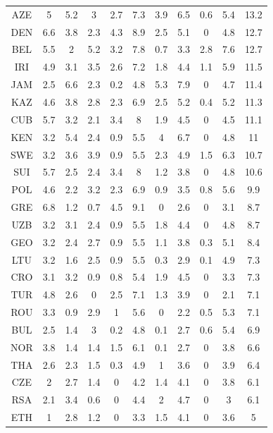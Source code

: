 \documentclass{mcmthesis}
\begin{document}
\begin{table}[htbp]
\begin{tabular}{|c|c|c|c|c|c|c|c|c|c|c|}
        AZE & 5 & 5.2 & 3 & 2.7 & 7.3 & 3.9 & 6.5 & 0.6 & 5.4 & 13.2 \\
        DEN & 6.6 & 3.8 & 2.3 & 4.3 & 8.9 & 2.5 & 5.1 & 0 & 4.8 & 12.7 \\
        BEL & 5.5 & 2 & 5.2 & 3.2 & 7.8 & 0.7 & 3.3 & 2.8 & 7.6 & 12.7 \\
        IRI & 4.9 & 3.1 & 3.5 & 2.6 & 7.2 & 1.8 & 4.4 & 1.1 & 5.9 & 11.5 \\
        JAM & 2.5 & 6.6 & 2.3 & 0.2 & 4.8 & 5.3 & 7.9 & 0 & 4.7 & 11.4 \\
        KAZ & 4.6 & 3.8 & 2.8 & 2.3 & 6.9 & 2.5 & 5.2 & 0.4 & 5.2 & 11.3 \\
        CUB & 5.7 & 3.2 & 2.1 & 3.4 & 8 & 1.9 & 4.5 & 0 & 4.5 & 11.1 \\
        KEN & 3.2 & 5.4 & 2.4 & 0.9 & 5.5 & 4 & 6.7 & 0 & 4.8 & 11 \\
        SWE & 3.2 & 3.6 & 3.9 & 0.9 & 5.5 & 2.3 & 4.9 & 1.5 & 6.3 & 10.7 \\
        SUI & 5.7 & 2.5 & 2.4 & 3.4 & 8 & 1.2 & 3.8 & 0 & 4.8 & 10.6 \\
        POL & 4.6 & 2.2 & 3.2 & 2.3 & 6.9 & 0.9 & 3.5 & 0.8 & 5.6 & 9.9 \\
        GRE & 6.8 & 1.2 & 0.7 & 4.5 & 9.1 & 0 & 2.6 & 0 & 3.1 & 8.7 \\
        UZB & 3.2 & 3.1 & 2.4 & 0.9 & 5.5 & 1.8 & 4.4 & 0 & 4.8 & 8.7 \\
        GEO & 3.2 & 2.4 & 2.7 & 0.9 & 5.5 & 1.1 & 3.8 & 0.3 & 5.1 & 8.4 \\
        LTU & 3.2 & 1.6 & 2.5 & 0.9 & 5.5 & 0.3 & 2.9 & 0.1 & 4.9 & 7.3 \\
        CRO & 3.1 & 3.2 & 0.9 & 0.8 & 5.4 & 1.9 & 4.5 & 0 & 3.3 & 7.3 \\
        TUR & 4.8 & 2.6 & 0 & 2.5 & 7.1 & 1.3 & 3.9 & 0 & 2.1 & 7.1 \\
        ROU & 3.3 & 0.9 & 2.9 & 1 & 5.6 & 0 & 2.2 & 0.5 & 5.3 & 7.1 \\
        BUL & 2.5 & 1.4 & 3 & 0.2 & 4.8 & 0.1 & 2.7 & 0.6 & 5.4 & 6.9 \\
        NOR & 3.8 & 1.4 & 1.4 & 1.5 & 6.1 & 0.1 & 2.7 & 0 & 3.8 & 6.6 \\
        THA & 2.6 & 2.3 & 1.5 & 0.3 & 4.9 & 1 & 3.6 & 0 & 3.9 & 6.4 \\
        CZE & 2 & 2.7 & 1.4 & 0 & 4.2 & 1.4 & 4.1 & 0 & 3.8 & 6.1 \\
        RSA & 2.1 & 3.4 & 0.6 & 0 & 4.4 & 2 & 4.7 & 0 & 3 & 6.1 \\
        ETH & 1 & 2.8 & 1.2 & 0 & 3.3 & 1.5 & 4.1 & 0 & 3.6 & 5 \\

\end{tabular}
\end{table}
\end{document}
